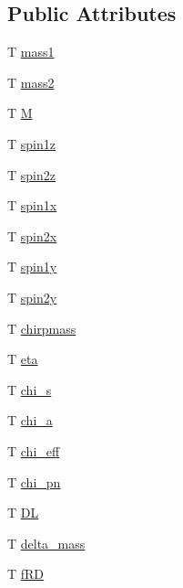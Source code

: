 \subsection*{Public Attributes}
\begin{DoxyCompactItemize}
\item 
T \hyperlink{structsource__parameters_a1a222ddfbc43359da566d085d92e7b72}{mass1}
\item 
T \hyperlink{structsource__parameters_a889d5e8ae96cec656504784f19916b5d}{mass2}
\item 
T \hyperlink{structsource__parameters_a52eefefefdf8c0bc989b64a115aed48a}{M}
\item 
T \hyperlink{structsource__parameters_a4184da329b8db0612133d4202f5f2769}{spin1z}
\item 
T \hyperlink{structsource__parameters_a1dfb782bc530dd8bc64a8a454da4e698}{spin2z}
\item 
T \hyperlink{structsource__parameters_a7112cbffca6f374199399cb2a4676440}{spin1x}
\item 
T \hyperlink{structsource__parameters_ac5278ad7984fb12f6a0c0277d6c6f25e}{spin2x}
\item 
T \hyperlink{structsource__parameters_aee9a22b3a44293741d68b303f0b40c06}{spin1y}
\item 
T \hyperlink{structsource__parameters_a7f457ff3d231ba2f254570a7e09f45f9}{spin2y}
\item 
T \hyperlink{structsource__parameters_a45ed5fee56015020945397cad4090c0b}{chirpmass}
\item 
T \hyperlink{structsource__parameters_ad0c3de98a95860855de219af0e095e81}{eta}
\item 
T \hyperlink{structsource__parameters_a795a4c996933c8096dc507fb4b77660c}{chi\+\_\+s}
\item 
T \hyperlink{structsource__parameters_abb7188532f4129d5b952aa040ca2a68f}{chi\+\_\+a}
\item 
T \hyperlink{structsource__parameters_af76e6fbb66cdb45dc7ce96eb7ff1440c}{chi\+\_\+eff}
\item 
T \hyperlink{structsource__parameters_aa1898ec9379fb825dd3a327292e7466e}{chi\+\_\+pn}
\item 
T \hyperlink{structsource__parameters_a3b63b38f49f875e1d9cc150c5753aa3c}{DL}
\item 
T \hyperlink{structsource__parameters_a6485c9fc5622ab2cd81170ceef81db66}{delta\+\_\+mass}
\item 
T \hyperlink{structsource__parameters_ad221b8f66ef2d9fd878b1c70461b60db}{f\+RD}
\item 

\end{DoxyCompactItemize}

